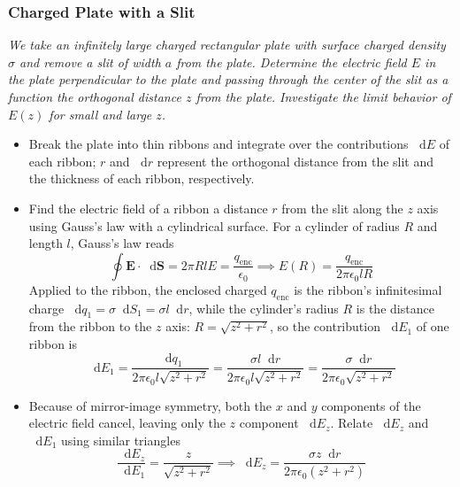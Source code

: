 \documentclass[11pt, a4paper]{article}
\newcommand{\diff}{\mathop{}\!\mathrm{d}} %
\renewcommand{\vec}[1]{\bm{#1}} %
\begin{document}
\subsubsection{Charged Plate with a Slit}
\textit{We take an infinitely large charged rectangular plate with surface charged density $ \sigma $ and remove a slit of width $ a $ from the plate. Determine the electric field $ E $ in the plate perpendicular to the plate and passing through the center of the slit as a function the orthogonal distance $ z $ from the plate. Investigate the limit behavior of $ E(z) $ for small and large $ z $.}
\begin{itemize}
	\item Break the plate into thin ribbons and integrate over the contributions $ \diff E $ of each ribbon; $ r $ and $ \diff r $ represent the orthogonal distance from the slit and the thickness of each ribbon, respectively.
	
	\item Find the electric field of a ribbon a distance $ r $ from the slit along the $ z $ axis using Gauss's law with a cylindrical surface. For a cylinder of radius $ R $ and length $ l $, Gauss's law reads
	\begin{equation*}
		\oint \vec{E} \cdot \diff \vec{S} = 2\pi R l E = \frac{q_{\text{enc}}}{\epsilon_{0}} \implies E(R) = \frac{q_{\text{enc}}}{2\pi \epsilon_{0} l R}
	\end{equation*}
	Applied to the ribbon, the enclosed charged $ q_{\text{enc}} $ is the ribbon's infinitesimal charge $ \diff q_{1} = \sigma \diff S_{1} = \sigma l \diff r $, while the cylinder's radius $ R $ is the distance from the ribbon to the $ z $ axis: $ R = \sqrt{z^{2} + r^{2}} $, so the contribution $ \diff E_{1} $ of one ribbon is
	\begin{equation*}
		\diff E_{1} = \frac{\diff q_{1}}{2\pi \epsilon_{0} l \sqrt{z^{2} + r^{2}}} = \frac{\sigma l \diff r}{2\pi \epsilon_{0} l\sqrt{z^{2} + r^{2}} } = \frac{\sigma \diff r}{2\pi \epsilon_{0} \sqrt{z^{2} + r^{2}} }
	\end{equation*}
	
	\item Because of mirror-image symmetry, both the $ x $ and $ y $ components of the electric field cancel, leaving only the $ z $ component $ \diff E_{z} $. Relate $ \diff E_{z} $ and $ \diff E_{1} $ using similar triangles
	\begin{equation*}
		\frac{\diff E_{z}}{\diff E_{1}} = \frac{z}{\sqrt{z^{2} + r^{2}}} \implies  \diff E_{z} = \frac{\sigma z \diff r}{2\pi \epsilon_{0} (z^{2} + r^{2})}
	\end{equation*}
	

\end{itemize}
\end{document}
